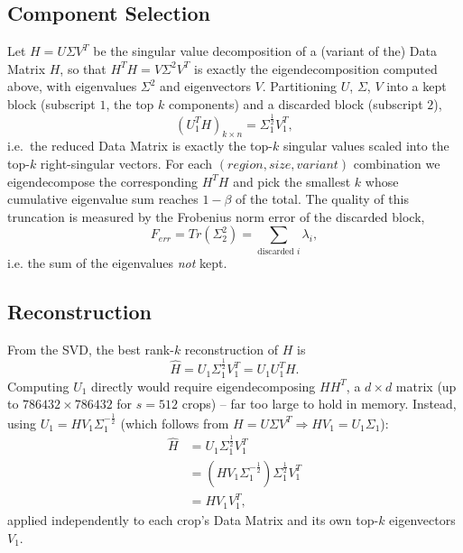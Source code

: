 \documentclass[a4paper,11pt]{article}
\begin{document}
\subsection{Component Selection}
Let $H = U\Sigma V^T$ be the singular value decomposition of a (variant of
the) Data Matrix $H$, so that $H^TH = V\Sigma^2V^T$ is exactly the
eigendecomposition computed above, with eigenvalues $\Sigma^2$ and
eigenvectors $V$. Partitioning $U$, $\Sigma$, $V$ into a kept block (subscript
$1$, the top $k$ components) and a discarded block (subscript $2$),
\begin{displaymath}
    (U_1^TH)_{k\times n} = \Sigma_1^{\frac{1}{2}}V_1^T,
\end{displaymath}
i.e.\ the reduced Data Matrix is exactly the top-$k$ singular values scaled
into the top-$k$ right-singular vectors. For each $(region, size, variant)$
combination we eigendecompose the corresponding $H^TH$ and pick the
smallest $k$ whose cumulative eigenvalue sum reaches $1-\beta$ of the total.
The quality of this truncation is measured by the Frobenius norm error of
the discarded block,
\begin{displaymath}
    F_{err} = Tr(\Sigma_2^2) = \sum_{\text{discarded }i}\lambda_i,
\end{displaymath}
i.e. the sum of the eigenvalues \emph{not} kept.

\subsection{Reconstruction}
From the SVD, the best rank-$k$ reconstruction of $H$ is
\begin{displaymath}
    \hat H = U_1\Sigma_1^{\frac{1}{2}}V_1^T = U_1U_1^TH.
\end{displaymath}
Computing $U_1$ directly would require eigendecomposing $HH^T$, a
$d\times d$ matrix (up to $786432\times786432$ for $s=512$ crops) -- far too
large to hold in memory. Instead, using $U_1 = HV_1\Sigma_1^{-\frac{1}{2}}$
(which follows from $H = U\Sigma V^T \Rightarrow HV_1 = U_1\Sigma_1$):
\begin{align*}
    \hat H &= U_1\Sigma_1^{\frac{1}{2}}V_1^T\\
    &= \left(HV_1\Sigma_1^{-\frac{1}{2}}\right)\Sigma_1^{\frac{1}{2}}V_1^T\\
    &= HV_1V_1^T,
\end{align*}
applied independently to each crop's Data Matrix and its own top-$k$
eigenvectors $V_1$.
\end{document}
